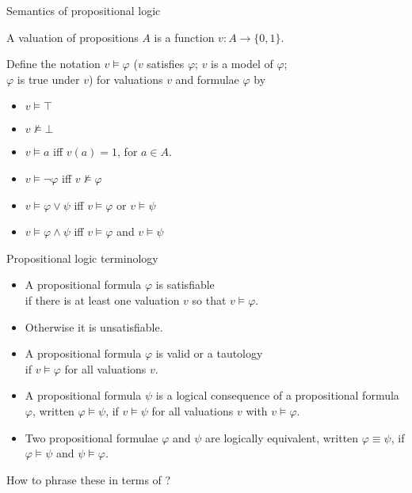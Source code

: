 \documentclass{gkibeamer}
\begin{document}
\begin{frame}{Semantics of propositional logic}
  \begin{definition}
    A \alert{valuation} of propositions $A$ is a function
    $v: A \rightarrow \{0, 1\}$.

    \medskip
    
    Define the notation \alert{$v \models \varphi$} ($v$
    \alert{satisfies} $\varphi$; $v$ is a \alert{model} of $\varphi$;
    \\ $\varphi$ is \alert{true} under $v$) for valuations $v$ and
    formulae $\varphi$ by
    \begin{itemize}
    \item $v \models \top$
    \item $v \not\models \bot$
    \item $v \models a$ iff $v(a) = 1$, for $a \in A$.
    \item $v \models \neg \varphi$ iff $v \not\models \varphi$
    \item $v \models \varphi \lor \psi$ iff $v \models \varphi$ or
      $v \models \psi$ 
    \item $v \models \varphi \land \psi$ iff $v \models \varphi$
      and $v \models \psi$ 
    \end{itemize}
  \end{definition}
\end{frame}

\begin{frame}{Propositional logic terminology}
  \begin{itemize}
  \item A propositional formula $\varphi$ is \alert{satisfiable} \\
    if there is at least one valuation $v$ so that $v \models \varphi$.
  \item Otherwise it is \alert{unsatisfiable}.
  \item A propositional formula $\varphi$ is \alert{valid} or a
    \alert{tautology} \\
    if $v \models \varphi$ for all valuations $v$.
  \item A propositional formula $\psi$ is a \alert{logical
    consequence} of a propositional formula $\varphi$, written
    \alert{$\varphi \models \psi$}, if $v \models \psi$ for all
    valuations $v$ with $v \models \varphi$.
  \item Two propositional formulae $\varphi$ and $\psi$ are
    \alert{logically equivalent}, written \alert{$\varphi \equiv \psi$},
    if $\varphi \models \psi$ and $\psi \models \varphi$.
  \end{itemize}
   How to phrase these in terms of ?
\end{frame}
\end{document}

